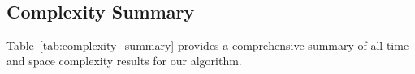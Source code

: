 ﻿﻿\documentclass[12pt,a4paper]{article}
\theoremstyle{definition}
\theoremstyle{remark}
\begin{document}


\subsection{Complexity Summary}

Table~\ref{tab:complexity_summary} provides a comprehensive summary of all time and space complexity results for our algorithm.
\end{document}
